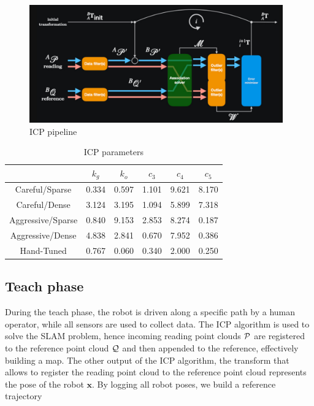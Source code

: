 \begin{figure} [htpb]
	\centering
	\includegraphics[height=2.0in]{figs/icp_pipeline.pdf}
	\caption{ICP pipeline}
	\label{fig:icp_pipeline}
\end{figure}


\begin{table}[htpb]
	\caption{\ac{ICP} parameters} \label{tab:icp_params}
	\begin{center}
		\begin{tabular}{|c|c|c|c|c|c|}
			\hline
			& $k_{g}$ & $k_{o}$ & $c_{3}$ & $c_{4}$ & $c_{5}$ \\
			\hline\hline
			Careful/Sparse & 0.334 & 0.597 & 1.101 & 9.621 & 8.170 \\ \hline
			Careful/Dense & 3.124 & 3.195 & 1.094 & 5.899 & 7.318 \\ \hline
			Aggressive/Sparse & 0.840 & 9.153 & 2.853 & 8.274 & 0.187 \\ \hline
			Aggressive/Dense & 4.838 & 2.841 & 0.670 & 7.952 & 0.386 \\ \hline
			Hand-Tuned & 0.767 & 0.060 & 0.340 & 2.000 & 0.250 \\
			\hline
		\end{tabular}
	\end{center}
\end{table}

\subsection{Teach phase}
\label{sec:teach_phase}

During the teach phase, the robot is driven along a specific path by a human operator, while all sensors are used to collect data.
The \ac{ICP} algorithm is used to solve the \ac{SLAM} problem, hence incoming reading point clouds $\mathcal{P}$ are registered to the reference point cloud $\mathcal{Q}$ and then appended to the reference, effectively building a map.
The other output of the \ac{ICP} algorithm, the transform that allows to register the reading point cloud to the reference point cloud \transform{\lidarf}{\mapf} represents the pose of the robot $\bm x$.
By logging all robot poses, we build a reference trajectory



